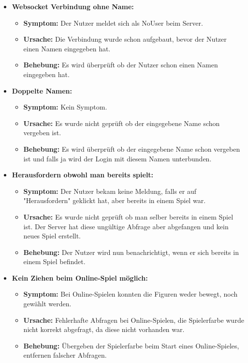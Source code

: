 \documentclass[parskip=full]{scrartcl}
\begin{document}
\begin{itemize}
\item{\textbf{Websocket Verbindung ohne Name:}}
\begin{itemize}
	\item{\textbf{Symptom:}} Der Nutzer meldet sich als NoUser beim Server.
	\item{\textbf{Ursache:}} Die Verbindung wurde schon aufgebaut, bevor der Nutzer einen Namen eingegeben hat.
	\item{\textbf{Behebung:}} Es wird überprüft ob der Nutzer schon einen Namen eingegeben hat.
\end{itemize}

\item{\textbf{Doppelte Namen:}}
\begin{itemize}
	\item{\textbf{Symptom:}} Kein Symptom.
	\item{\textbf{Ursache:}} Es wurde nicht geprüft ob der eingegebene Name schon vergeben ist.
	\item{\textbf{Behebung:}} Es wird überprüft ob der eingegebene Name schon vergeben ist und falls ja wird der Login mit diesem Namen unterbunden.
\end{itemize}

\item{\textbf{Herausfordern obwohl man bereits spielt:}}
\begin{itemize}
	\item{\textbf{Symptom:}} Der Nutzer bekam keine Meldung, falls er auf "Herausfordern" geklickt hat, aber bereits in einem Spiel war.
	\item{\textbf{Ursache:}} Es wurde nicht geprüft ob man selber bereits in einem Spiel ist. Der Server hat diese ungültige Abfrage aber abgefangen und kein neues Spiel erstellt. 
	\item{\textbf{Behebung:}} Der Nutzer wird nun benachrichtigt, wenn er sich bereits in einem Spiel befindet.
\end{itemize}


\item{\textbf{Kein Ziehen beim Online-Spiel möglich:}}
\begin{itemize}
	\item{\textbf{Symptom:}} Bei Online-Spielen konnten die Figuren weder bewegt, noch gewählt werden.
	\item{\textbf{Ursache:}} Fehlerhafte Abfragen bei Online-Spielen, die Spielerfarbe wurde nicht korrekt abgefragt, da diese nicht vorhanden war.
	\item{\textbf{Behebung:}} Übergeben der Spielerfarbe beim Start eines Online-Spieles, entfernen falscher Abfragen.
\end{itemize}


\end{itemize}
\end{document}

